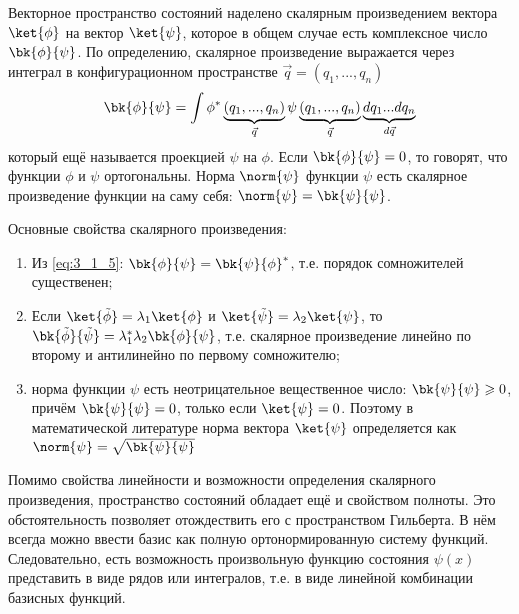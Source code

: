 Векторное пространство состояний наделено скалярным произведением вектора $\ket{\phi}$ на вектор $\ket{\psi}$, которое в общем случае есть комплексное число $\bk{\phi}{\psi}$. По определению, скалярное произведение выражается через интеграл в конфигурационном пространстве $\vec{q} = (q_1, ..., q_n)$%
%
\begin{equation}
\label{eq:3_1_5}
\bk{\phi}{\psi} = \int \phi^*\underbrace{(q_1, ..., q_n)}_{\vec{q}} \psi\underbrace{(q_1, ..., q_n)}_{\vec{q}} \underbrace{d q_1 ... d q_n}_{d\vec{q}}
\end{equation}%
%
который ещё называется проекцией $\psi$ на $\phi$. Если $\bk{\phi}{\psi} = 0$, то говорят, что функции $\phi$ и $\psi$ ортогональны. Норма $\norm{\psi}$ функции $\psi$ есть скалярное произведение функции на саму себя: $\norm{\psi} = \bk{\psi}{\psi}$.

Основные свойства скалярного произведения:%
%
\begin{enumerate}
  \item Из \eqref{eq:3_1_5}: $\bk{\phi}{\psi} = \bk{\psi}{\phi}^*$, т.е. порядок сомножителей существенен;
%
  \item Если $\ket{\tilde{\phi}} = \lambda_1\ket{\phi}$ и $\ket{\tilde{\psi}} = \lambda_2\ket{\psi}$, то $\bk{\tilde{\phi}}{\tilde{\psi}} = \lambda_1^* \lambda_2 \bk{\phi}{\psi}$, т.е. скалярное произведение линейно по второму и антилинейно по первому сомножителю;
%
  \item норма функции $\psi$ есть неотрицательное вещественное число: $\bk{\psi}{\psi} \geqslant 0$, причём $\bk{\psi}{\psi} = 0$, только если $\ket{\psi} = 0$. Поэтому в математической литературе норма вектора $\ket{\psi}$ определяется как $\norm{\psi} = \sqrt{\bk{\psi}{\psi}}$
\end{enumerate}

Помимо свойства линейности и возможности определения скалярного произведения, пространство состояний обладает ещё и свойством полноты. Это обстоятельность позволяет отождествить его с пространством Гильберта\footnotemark. В нём всегда можно ввести базис как полную ортонормированную систему функций. Следовательно, есть возможность произвольную функцию состояния $\psi(x)$ представить в виде рядов или интегралов, т.е. в виде линейной комбинации базисных функций.

